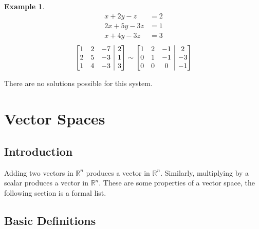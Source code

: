 \documentclass{report}
\makeatletter
\newenvironment{amatrix}[1]{%
  \left[\begin{array}{@{}*{#1}{c}|c@{}}
}{%
  \end{array}\right]
}
\theoremstyle{definition}
\newtheorem{ex}{Example}[section]
\theoremstyle{remark}
\makeatother
\begin{document}
\begin{ex}
\begin{align*}
x+2y-z&=2 \\
2x+5y-3z&=1 \\
x+4y-3z&=3
\end{align*}
\[\begin{amatrix}{3}
 1 & 2 & -7 & 2 \\
 2 & 5 & -3 & 1 \\
 1 & 4 & -3 & 3
\end{amatrix}\sim
\begin{amatrix}{3}
 1 & 2 & -1 & 2 \\
 0 & 1 & -1 & -3 \\
 0 & 0 & 0 & -1
\end{amatrix}
\]

There are no solutions possible for this system.
\end{ex}

\chapter{Vector Spaces}

\section{Introduction}

Adding two vectors in $\mathbb{R}^n$ produces a vector in $\mathbb{R}^n$.
Similarly, multiplying by a scalar produces a vector in $\mathbb{R}^n$.
These are some properties of a vector space, the following section is a formal list.

\section{Basic Definitions}
\end{document}
